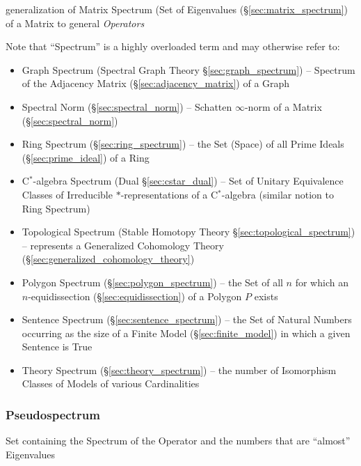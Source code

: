 generalization of Matrix Spectrum (Set of Eigenvalues
(\S\ref{sec:matrix_spectrum}) of a Matrix to general \emph{Operators}

\fist Note that ``Spectrum'' is a highly overloaded term and may otherwise
refer to:
\begin{itemize}
  \item Graph Spectrum (Spectral Graph Theory \S\ref{sec:graph_spectrum}) --
    Spectrum of the Adjacency Matrix (\S\ref{sec:adjacency_matrix}) of a Graph

  \item Spectral Norm (\S\ref{sec:spectral_norm}) -- Schatten $\infty$-norm of
    a Matrix (\S\ref{sec:spectral_norm})

  \item Ring Spectrum (\S\ref{sec:ring_spectrum}) -- the Set (Space) of all
    Prime Ideals (\S\ref{sec:prime_ideal}) of a Ring
  \item C$^*$-algebra Spectrum (Dual \S\ref{sec:cstar_dual}) -- Set of Unitary
    Equivalence Classes of Irreducible $*$-representations of a C$^*$-algebra
    (similar notion to Ring Spectrum)

  \item Topological Spectrum (Stable Homotopy Theory
    \S\ref{sec:topological_spectrum}) -- represents a Generalized Cohomology
    Theory (\S\ref{sec:generalized_cohomology_theory})

  \item Polygon Spectrum (\S\ref{sec:polygon_spectrum}) -- the Set of all $n$
    for which an $n$-equidissection (\S\ref{sec:equidissection}) of a Polygon
    $P$ exists

  \item Sentence Spectrum (\S\ref{sec:sentence_spectrum}) -- the Set of Natural
    Numbers occurring as the size of a Finite Model
    (\S\ref{sec:finite_model}) in which a given Sentence is True
  \item Theory Spectrum (\S\ref{sec:theory_spectrum}) -- the number of
    Isomorphism Classes of Models of various Cardinalities
\end{itemize}



\subsubsection{Pseudospectrum}\label{sec:pseudospectrum}

Set containing the Spectrum of the Operator and the numbers that are ``almost''
Eigenvalues




